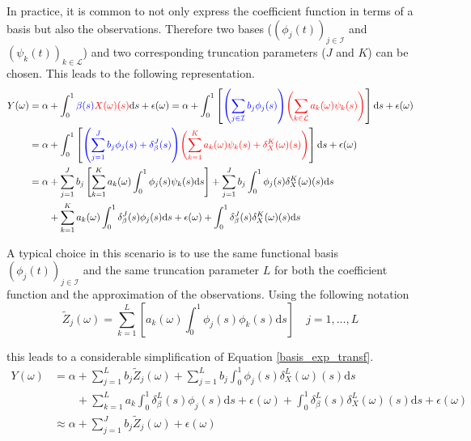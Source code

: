 \documentclass[11pt,twoside,a4paper]{article}
\begin{document}
	In practice, it is common to not only express the coefficient function in terms of a basis but also the observations. Therefore two bases ($\left(\phi_j(t)\right)_{j \in \mathcal{I}}$ and $\left(\psi_k(t)\right)_{k \in \mathcal{L}}$) and two corresponding truncation parameters ($J$ and $K$) can be chosen. This leads to the following representation.
	\begin{equation}
		\begin{split}
			Y(\omega) & = \alpha + \int_{0}^{1} {\color{blue}\beta(s)} {\color{red}X(\omega)(s)}\mathrm{d}s + \epsilon(\omega)
			 = \alpha + \int_{0}^{1}\left[{\color{blue}\left(\sum_{j \in \mathcal{I}} b_j  \phi_j(s)\right)} {\color{red}\left(\sum_{k \in \mathcal{L}} a_k(\omega)  \psi_k(s)\right)} \right]\mathrm{d}s + \epsilon(\omega) \\
			& = \alpha + \int_{0}^{1}\left[{\color{blue}\left(\sum_{j = 1}^{J} b_j  \phi_j(s) + \delta_{\beta}^{J}(s)\right)} {\color{red}\left(\sum_{k = 1}^K a_k(\omega)  \psi_k(s) + \delta_{X}^{K}(\omega)(s)\right)} \right]\mathrm{d}s + \epsilon(\omega)\\
			& = \alpha + \sum_{j = 1}^J b_j \left[\sum_{k = 1}^K a_k(\omega) \int_{0}^{1} \phi_j(s) \psi_k(s) \mathrm{d}s\right] + \sum_{j = 1}^{J} b_j  \int_{0}^{1} \phi_j(s) \delta_{X}^{K}(\omega)(s) \mathrm{d}s\\
			& \quad \quad + \sum_{k = 1}^{K} a_k(\omega)  \int_{0}^{1} \delta_{\beta}^{J}(s)\phi_j(s) \mathrm{d}s + \epsilon(\omega) + \int_{0}^{1}  \delta_{\beta}^{J}(s) \delta_{X}^{K}(\omega)(s) \mathrm{d}s
		\end{split}
	\end{equation}

	A typical choice in this scenario is to use the same functional basis $\left(\phi_j(t)\right)_{j \in \mathcal{I}}$ and the same truncation parameter $L$ for both the coefficient function and the approximation of the observations. Using the following notation 
	\begin{equation}
			\tilde{Z}_j(\omega) = \sum_{k = 1}^{L} \left[a_k(\omega) \int_{0}^{1} \phi_j(s) \phi_k(s) \mathrm{d}s \right] \quad j = 1, \dots, L
	\end{equation}

	this leads to a considerable simplification of Equation \ref{basis_exp_transf}.
	\begin{equation}\label{simplified_model_basis_equation}
		\begin{split}
			Y(\omega) &= \alpha + \sum_{j = 1}^{L} b_j \tilde{Z}_j(\omega) + \sum_{j = 1}^{L} b_j  \int_{0}^{1} \phi_j(s) \delta_{X}^{L}(\omega)(s) \mathrm{d}s\\
			& \quad \quad + \sum_{k = 1}^{L} a_k  \int_{0}^{1} \delta_{\beta}^{L}(s)\phi_j(s) \mathrm{d}s + \epsilon(\omega) + \int_{0}^{1}  \delta_{\beta}^{L}(s) \delta_{X}^{L}(\omega)(s) \mathrm{d}s + \epsilon(\omega)\\
			& \approx \alpha + \sum_{j = 1}^{J} b_j \tilde{Z}_j(\omega) + \epsilon(\omega)
		\end{split}
	\end{equation}
\end{document}
